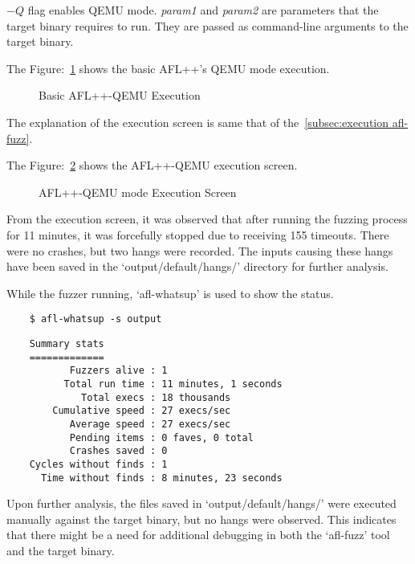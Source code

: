 \begin{math}-Q\end{math} flag enables QEMU mode.
\textit{param1} and \textit{param2} are parameters that the target binary requires to run.
They are passed as command-line arguments to the target binary.

The Figure:~\ref{fig:simplified_closed_binaries_qemu} shows the basic
AFL++'s QEMU mode execution.

\begin{figure}[H]
    \centering
    {}
    \caption{Basic AFL++-QEMU Execution }\label{fig:simplified_closed_binaries_qemu}
\end{figure}

The explanation of the execution screen is same that of the~\ref{subsec:execution afl-fuzz}.

The Figure:~\ref{fig:afl_execute_qemu} shows the AFL++-QEMU execution screen.
\begin{figure}[H]
    \centering
    {}
    \caption{AFL++-QEMU mode Execution Screen}\label{fig:afl_execute_qemu}
\end{figure}


From the execution screen, it was observed that after running the fuzzing
process for 11 minutes, it was forcefully stopped due to receiving 155 timeouts.
There were no crashes, but two hangs were recorded. The inputs causing these
hangs have been saved in the `output/default/hangs/' directory for further
analysis.

While the fuzzer running, `afl-whatsup' is used to show the status.

\begin{verbatim}
    $ afl-whatsup -s output
\end{verbatim}

\begin{verbatim}
    Summary stats
    =============
           Fuzzers alive : 1
          Total run time : 11 minutes, 1 seconds
             Total execs : 18 thousands
        Cumulative speed : 27 execs/sec
           Average speed : 27 execs/sec
           Pending items : 0 faves, 0 total
           Crashes saved : 0
    Cycles without finds : 1
      Time without finds : 8 minutes, 23 seconds
\end{verbatim}

Upon further analysis, the files saved in `output/default/hangs/' were executed
manually against the target binary, but no hangs were observed. This indicates
that there might be a need for additional debugging in both the `afl-fuzz' tool
and the target binary. 
\clearpage